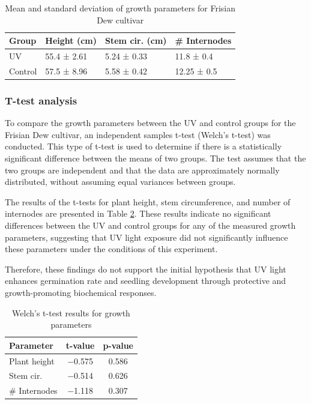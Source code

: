 \begin{table}[htbp]
    \caption[Mean and standard deviation of growth parameters]{Mean and standard deviation of growth parameters for Frisian Dew cultivar}
    \label{tab:descriptive_statistics}
    \begin{tabularx}{\linewidth}{lXXX}
        \toprule
        \textbf{Group} & \textbf{Height (\unit[mode=text]{\cm})} & \textbf{Stem cir. (\unit[mode=text]{\cm})} & \textbf{\# Internodes} \\
        \midrule
        UV & \num[mode=text]{55.4} ± \num[mode=text]{2.61} & \num[mode=text]{5.24} ± \num[mode=text]{0.33} & \num[mode=text]{11.8} ± \num[mode=text]{0.4} \\
        Control & \num[mode=text]{57.5} ± \num[mode=text]{8.96} & \num[mode=text]{5.58} ± \num[mode=text]{0.42} & \num[mode=text]{12.25} ± \num[mode=text]{0.5} \\
        \bottomrule
    \end{tabularx}
\end{table}

\subsubsection{T-test analysis}

To compare the growth parameters between the UV and control groups for the Frisian Dew cultivar, an independent samples t-test (Welch's t-test) was conducted. This type of t-test is used to determine if there is a statistically significant difference between the means of two groups. The test assumes that the two groups are independent and that the data are approximately normally distributed, without assuming equal variances between groups.

The results of the t-tests for plant height, stem circumference, and number of internodes are presented in Table \ref{tab:ttest_results}. These results indicate no significant differences between the UV and control groups for any of the measured growth parameters, suggesting that UV light exposure did not significantly influence these parameters under the conditions of this experiment.

Therefore, these findings do not support the initial hypothesis that UV light enhances germination rate and seedling development through protective and growth-promoting biochemical responses.

\begin{table}[htbp]
    \caption{Welch's t-test results for growth parameters}
    \label{tab:ttest_results}
    \begin{tabularx}{\linewidth}{lcc}
        \toprule
        \textbf{Parameter} & \textbf{t-value} & \textbf{p-value} \\
        \midrule
        Plant height & \num[mode=text]{-0.575} & \num[mode=text]{0.586} \\
        Stem cir. & \num[mode=text]{-0.514} & \num[mode=text]{0.626} \\
        \# Internodes & \num[mode=text]{-1.118} & \num[mode=text]{0.307} \\
        \bottomrule
    \end{tabularx}
\end{table}

